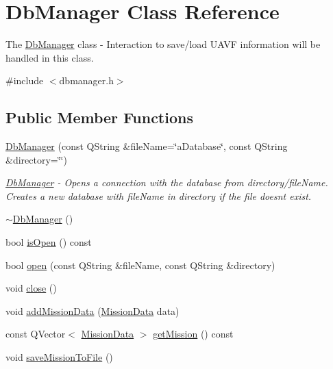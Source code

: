 \hypertarget{class_db_manager}{}\section{Db\+Manager Class Reference}
\label{class_db_manager}


The \hyperlink{class_db_manager}{Db\+Manager} class -\/ Interaction to save/load U\+A\+V\+F information will be handled in this class.  




{\ttfamily \#include $<$dbmanager.\+h$>$}

\subsection*{Public Member Functions}
\begin{DoxyCompactItemize}
\item 
\hyperlink{class_db_manager_a7f5d145bb4b33b7d08f78a2ceee17a47}{Db\+Manager} (const Q\+String \&file\+Name=\char`\"{}a\+Database\char`\"{}, const Q\+String \&directory=\char`\"{}\char`\"{})
\begin{DoxyCompactList}\small\item\em \hyperlink{class_db_manager}{Db\+Manager} -\/ Opens a connection with the database from \textquotesingle{}directory/file\+Name\textquotesingle{}. Creates a new database with \textquotesingle{}file\+Name\textquotesingle{} in \textquotesingle{}directory\textquotesingle{} if the file doesn\textquotesingle{}t exist. \end{DoxyCompactList}\item 
\hyperlink{class_db_manager_ac5cdf8e5e932d1681ab807d8f256374c}{$\sim$\+Db\+Manager} ()
\item 
bool \hyperlink{class_db_manager_af26e2cb3fc39656e05f2c9b0cda89d59}{is\+Open} () const 
\item 
bool \hyperlink{class_db_manager_ab89634eca6b13b420dda1d56484ae427}{open} (const Q\+String \&file\+Name, const Q\+String \&directory)
\item 
void \hyperlink{class_db_manager_a0e118f2a45390cde3a118f8841e0875f}{close} ()
\item 
void \hyperlink{class_db_manager_a962e5ea4e83bb6f65f9d19f82a470687}{add\+Mission\+Data} (\hyperlink{struct_mission_data}{Mission\+Data} data)
\item 
const Q\+Vector$<$ \hyperlink{struct_mission_data}{Mission\+Data} $>$ \hyperlink{class_db_manager_adfe91eed71e54ff7d7b2f28d10800efe}{get\+Mission} () const 
\item 
void \hyperlink{class_db_manager_afac9da99cb97c29cae46e7488d681d36}{save\+Mission\+To\+File} ()
\end{DoxyCompactItemize}


